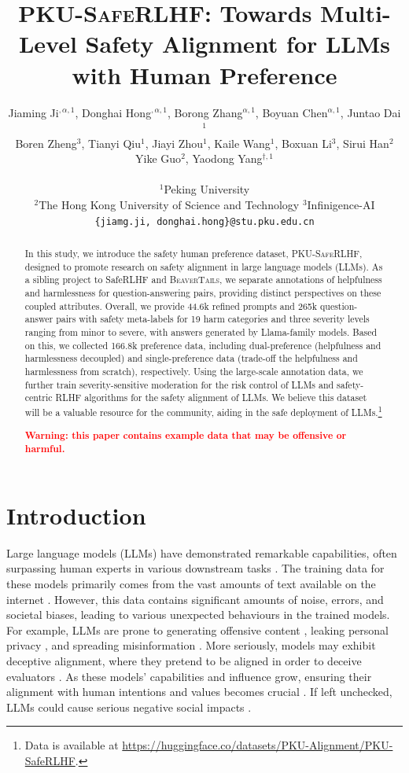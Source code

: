 \documentclass[11pt]{article}
\title{\textsc{PKU-SafeRLHF}: Towards Multi-Level Safety Alignment for LLMs with Human Preference}
\author{{\normalfont Jiaming Ji\footnotemark[1]$^{,\alpha,1}$,} {\normalfont Donghai Hong\footnotemark[1]$^{,\alpha,1}$,} {\normalfont Borong Zhang$^{\alpha,1}$,} {\normalfont Boyuan Chen$^{\alpha,1}$,} {\normalfont Juntao Dai}$^{1}$\\
{\normalfont Boren Zheng}$^{3}$, {\normalfont Tianyi Qiu}$^{1}$,  {\normalfont Jiayi Zhou}$^{1}$, {\normalfont Kaile Wang}$^{1}$, {\normalfont Boxuan Li}$^{3}$, {\normalfont Sirui Han}$^{2}$ \\
{\normalfont Yike Guo}$^{2}$, {\normalfont Yaodong Yang}$^{\dag,1}$\\
\vspace{-0.5em}\\
$^{1}$Peking University\\
$^{2}$The Hong Kong University of Science and Technology 
$^{3}$Infinigence-AI \\
\texttt{\{jiamg.ji, donghai.hong\}@stu.pku.edu.cn}
\\
}
\theoremstyle{plain}
\theoremstyle{definition}
\theoremstyle{remark}
\newcommand{\db}{\textsc{PKU-SafeRLHF}}
\begin{document}
\maketitle
{
\renewcommand{\thefootnote}{\fnsymbol{footnote}}
}
\begin{abstract}
In this study, we introduce the safety human preference dataset, \db{}, designed to promote research on safety alignment in large language models (LLMs). As a sibling project to SafeRLHF and \textsc{BeaverTails}, we separate annotations of helpfulness and harmlessness for question-answering pairs, providing distinct perspectives on these coupled attributes. 
Overall, we provide 44.6k refined prompts and 265k question-answer pairs with safety meta-labels for 19 harm categories and three severity levels ranging from minor to severe, with answers generated by Llama-family models.
Based on this, we collected 166.8k preference data, including dual-preference (helpfulness and harmlessness decoupled) and single-preference data (trade-off the helpfulness and harmlessness from scratch), respectively. 
Using the large-scale annotation data, we further train severity-sensitive moderation for the risk control of LLMs and safety-centric RLHF algorithms for the safety alignment of LLMs. We believe this dataset will be a valuable resource for the community, aiding in the safe deployment of LLMs.\footnote{Data is available at \url{https://huggingface.co/datasets/PKU-Alignment/PKU-SafeRLHF}.}

\textcolor{red}{\textbf{Warning: this paper contains example data that may be offensive or harmful.}}
\end{abstract}


\section{Introduction}
\label{sec:introduction}
Large language models (LLMs) have demonstrated remarkable capabilities, often surpassing human experts in various downstream tasks \cite{achiam2023gpt, anil2023palm, bai2023qwen,yang2023baichuan,meng2024application}. The training data for these models primarily comes from the vast amounts of text available on the internet \cite{together2023redpajama, touvron2023llama}. However, this data contains significant amounts of noise, errors, and societal biases, leading to various unexpected behaviours in the trained models. For example, LLMs are prone to generating offensive content \cite{ji2024beavertails}, leaking personal privacy \cite{yao2024survey}, and spreading misinformation \cite{pan2023risk,ji2025mirage}. More seriously, models may exhibit deceptive alignment, where they pretend to be aligned in order to deceive evaluators \citep{ji2025mitigating}. As these models' capabilities and influence grow, ensuring their alignment with human intentions and values becomes crucial \cite{ji2023ai}. If left unchecked, LLMs could cause serious negative social impacts \cite{statement_on_ai_risk_2023}.
\end{document}
